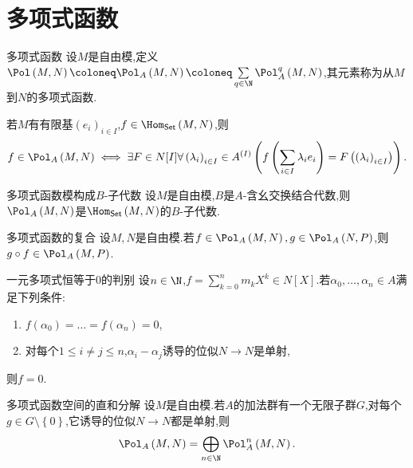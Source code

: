 \section{多项式函数}

\begin{definition}{多项式函数}{}
	设$M$是自由模,定义$\Pol\left(M,N\right)\coloneq\Pol_{A}\left(M,N\right)\coloneq\sum\limits_{q\in\N}\Pol_{A}^{q}\left(M,N\right)$,其元素称为从$M$到$N$的多项式函数.
\end{definition}

\begin{remark}{}{}
	若$M$有有限基$\left(e_{i}\right)_{i\in I}$,$f\in\Hom_{\mathsf{Set}}\left(M,N\right)$,则
	\begin{align*}
		f\in\Pol_{A}\left(M,N\right)\iff\exists F\in N[I]\forall\left(\lambda_{i}\right)_{i\in I}\in A^{\left(I\right)}\left(f\left(\sum\limits_{i\in I}\lambda_{i}e_{i}\right)=F\left(\left(\lambda_{i}\right)_{i\in I}\right)\right).
	\end{align*}
\end{remark}

\begin{proposition}{多项式函数模构成$B$-子代数}{}
	设$M$是自由模,$B$是$A$-含幺交换结合代数,则$\Pol_{A}\left(M,N\right)$是$\Hom_{\mathsf{Set}}\left(M,N\right)$的$B$-子代数.
\end{proposition}

\begin{proposition}{多项式函数的复合}{}
	设$M,N$是自由模.若$f\in\Pol_{A}\left(M,N\right),g\in\Pol_{A}\left(N,P\right)$,则$g\circ f\in\Pol_{A}\left(M,P\right)$.
\end{proposition}

\begin{lemma}{一元多项式恒等于$0$的判别}{}
	设$n\in\N$,$f=\sum\limits_{k=0}^{n}m_{k}X^{k}\in N[X]$.若$\alpha_{0},\ldots,\alpha_{n}\in A$满足下列条件:
	\begin{enumerate}
		\item $f\left(\alpha_{0}\right)=\ldots=f\left(\alpha_{n}\right)=0$,
		\item 对每个$1\leq i\neq j\leq n$,$\alpha_{i}-\alpha_{j}$诱导的位似$N\to N$是单射,
	\end{enumerate}
	则$f=0$.
\end{lemma}

\begin{proposition}{多项式函数空间的直和分解}{}
	设$M$是自由模.若$A$的加法群有一个无限子群$G$,对每个$g\in G\setminus\left\{0\right\}$,它诱导的位似$N\to N$都是单射,则
	\begin{align*}
		\Pol_{A}\left(M,N\right)=\bigoplus\limits_{n\in\N}\Pol_{A}^{n}\left(M,N\right).
	\end{align*}
\end{proposition}

